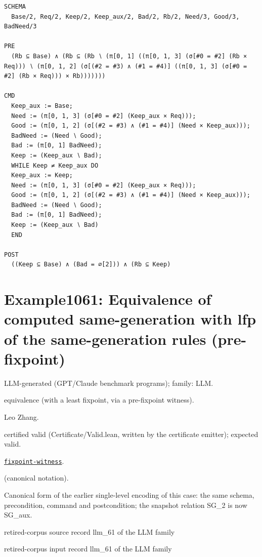\documentclass[10pt]{article}
\begin{document}
\begin{Verbatim}[fontsize=\scriptsize,breaklines=true,breakanywhere=true,frame=single,framesep=1.5mm]
SCHEMA
  Base/2, Req/2, Keep/2, Keep_aux/2, Bad/2, Rb/2, Need/3, Good/3, BadNeed/3

PRE
  (Rb ⊆ Base) ∧ (Rb ⊆ (Rb ∖ (π[0, 1] ((π[0, 1, 3] (σ[#0 = #2] (Rb × Req))) ∖ (π[0, 1, 2] (σ[(#2 = #3) ∧ (#1 = #4)] ((π[0, 1, 3] (σ[#0 = #2] (Rb × Req))) × Rb)))))))

CMD
  Keep_aux := Base;
  Need := (π[0, 1, 3] (σ[#0 = #2] (Keep_aux × Req)));
  Good := (π[0, 1, 2] (σ[(#2 = #3) ∧ (#1 = #4)] (Need × Keep_aux)));
  BadNeed := (Need ∖ Good);
  Bad := (π[0, 1] BadNeed);
  Keep := (Keep_aux ∖ Bad);
  WHILE Keep ≠ Keep_aux DO
  Keep_aux := Keep;
  Need := (π[0, 1, 3] (σ[#0 = #2] (Keep_aux × Req)));
  Good := (π[0, 1, 2] (σ[(#2 = #3) ∧ (#1 = #4)] (Need × Keep_aux)));
  BadNeed := (Need ∖ Good);
  Bad := (π[0, 1] BadNeed);
  Keep := (Keep_aux ∖ Bad)
  END

POST
  ((Keep ⊆ Base) ∧ (Bad = ∅[2])) ∧ (Rb ⊆ Keep)
\end{Verbatim}

\Needspace{0.45\textheight}

\section{Example1061: Equivalence of computed same-generation with lfp of the same-generation rules (pre-fixpoint)}\label{case:Example1061}

\begin{description}[leftmargin=2.6cm,style=nextline,itemsep=1pt]

\item[Category] LLM-generated (GPT/Claude benchmark programs); family: LLM.

\item[Kind] equivalence (with a least fixpoint, via a pre-fixpoint witness).

\item[Contributors] Leo Zhang.

\item[Status] certified valid (Certificate/Valid.lean, written by the certificate emitter); expected valid.

\item[Tags] \hyperref[tag:fixpoint-witness]{\texttt{fixpoint-witness}}.

\item[Input]  (canonical notation).

\item[Summary] Canonical form of the earlier single-level encoding of this case: the same schema, precondition, command and postcondition; the snapshot relation SG\_2 is now SG\_aux.

\item[Sources] {\raggedright retired-corpus source record llm\_61 of the LLM family \par retired-corpus input record llm\_61 of the LLM family\par}

\end{description}
\end{document}
